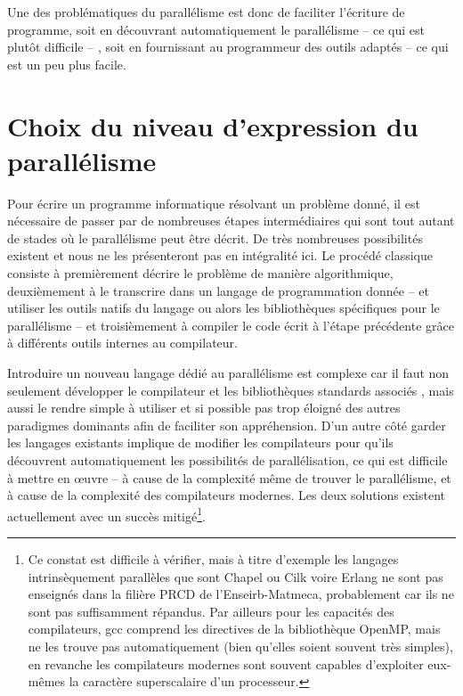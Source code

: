 Une des problématiques du parallélisme est donc de faciliter l'écriture de programme, soit en découvrant automatiquement le parallélisme -- ce qui est plutôt difficile -- , soit en fournissant au programmeur des outils adaptés -- ce qui est un peu plus facile.

\section{Choix du niveau d'expression du parallélisme}

Pour écrire un programme informatique résolvant un problème donné, il est nécessaire de passer par de nombreuses étapes intermédiaires qui sont tout autant de stades où le parallélisme peut être décrit. De très nombreuses possibilités existent et nous ne les présenteront pas en intégralité ici. Le procédé classique consiste à premièrement décrire le problème de manière algorithmique, deuxièmement à le transcrire dans un langage de programmation donnée -- et utiliser les outils natifs du langage ou alors les bibliothèques spécifiques pour le parallélisme -- et troisièmement à compiler le code écrit à l'étape précédente grâce à différents outils internes au compilateur.  

Introduire un nouveau langage dédié au parallélisme est complexe car il faut non seulement développer le compilateur et les bibliothèques standards associés , mais aussi le rendre simple à utiliser et si possible pas trop éloigné des autres paradigmes dominants afin de faciliter son appréhension. D'un autre côté garder les langages existants implique de modifier les compilateurs pour qu'ils découvrent automatiquement les possibilités de parallélisation, ce qui est difficile à mettre en œuvre -- à cause de la complexité même de trouver le parallélisme, et à cause de la complexité des compilateurs modernes. Les deux solutions existent actuellement avec un succès mitigé\footnote{Ce constat est difficile à vérifier, mais à titre d'exemple les langages intrinsèquement parallèles que sont \textsf{Chapel} ou \textsf{Cilk} voire \textsf{Erlang} ne sont pas enseignés dans la filière PRCD de l'Enseirb-Matmeca, probablement car ils ne sont pas suffisamment répandus. Par ailleurs pour les capacités des compilateurs, \textsf{gcc} comprend les directives de la bibliothèque \textsf{OpenMP}, mais ne les trouve pas automatiquement (bien qu'elles soient souvent très simples), en revanche les compilateurs modernes sont souvent capables d'exploiter eux-mêmes la caractère superscalaire d'un processeur.}.

